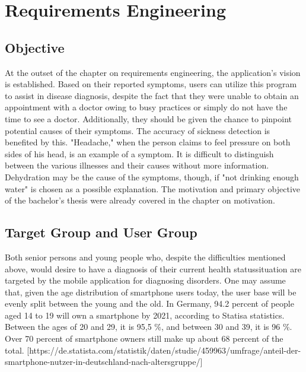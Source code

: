 
\chapter{Requirements Engineering}
\section{Objective}
At the outset of the chapter on requirements engineering, the application's vision is established. Based on their reported symptoms, users can utilize this program to assist in disease diagnosis, despite the fact that they were unable to obtain an appointment with a doctor owing to busy practices or simply do not have the time to see a doctor. 
Additionally, they should be given the chance to pinpoint potential causes of their symptoms. The accuracy of sickness detection is benefited by this. "Headache," when the person claims to feel pressure on both sides of his head, is an example of a symptom. It is difficult to distinguish between the various illnesses and their causes without more information. Dehydration may be the cause of the symptoms, though, if "not drinking enough water" is chosen as a possible explanation.
The motivation and primary objective of the bachelor's thesis were already covered in the chapter on motivation.

\section{Target Group and User Group}
Both senior persons and young people who, despite the difficulties mentioned above, would desire to have a diagnosis of their current health statussituation are targeted by the mobile application for diagnosing disorders.
One may assume that, given the age distribution of smartphone users today, the user base will be evenly split between the young and the old.
In Germany, 94.2 percent of people aged 14 to 19 will own a smartphone by 2021, according to Statisa statistics.
Between the ages of 20 and 29, it is 95,5 \%, and between 30 and 39, it is 96 \%.
Over 70 percent of smartphone owners still make up about 68 percent of the total.  [https://de.statista.com/statistik/daten/studie/459963/umfrage/anteil-der-smartphone-nutzer-in-deutschland-nach-altersgruppe/]

